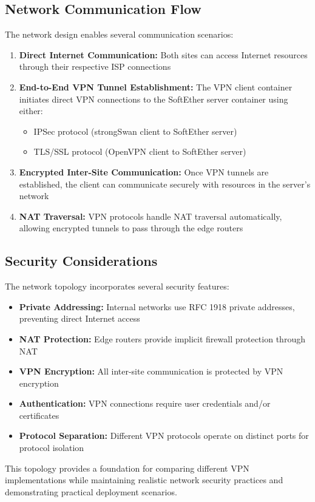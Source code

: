 \subsection{Network Communication Flow}

The network design enables several communication scenarios:

\begin{enumerate}
    \item \textbf{Direct Internet Communication:} Both sites can access Internet resources through their respective ISP connections
    
    \item \textbf{End-to-End VPN Tunnel Establishment:} The VPN client container initiates direct VPN connections to the SoftEther server container using either:
    \begin{itemize}
        \item IPSec protocol (strongSwan client to SoftEther server)
        \item TLS/SSL protocol (OpenVPN client to SoftEther server)
    \end{itemize}
    
    \item \textbf{Encrypted Inter-Site Communication:} Once VPN tunnels are established, the client can communicate securely with resources in the server's network
    
    \item \textbf{NAT Traversal:} VPN protocols handle NAT traversal automatically, allowing encrypted tunnels to pass through the edge routers
\end{enumerate}

\subsection{Security Considerations}

The network topology incorporates several security features:

\begin{itemize}
    \item \textbf{Private Addressing:} Internal networks use RFC 1918 private addresses, preventing direct Internet access
    \item \textbf{NAT Protection:} Edge routers provide implicit firewall protection through NAT
    \item \textbf{VPN Encryption:} All inter-site communication is protected by VPN encryption
    \item \textbf{Authentication:} VPN connections require user credentials and/or certificates
    \item \textbf{Protocol Separation:} Different VPN protocols operate on distinct ports for protocol isolation
\end{itemize}

This topology provides a foundation for comparing different VPN implementations while maintaining realistic network security practices and demonstrating practical deployment scenarios.
